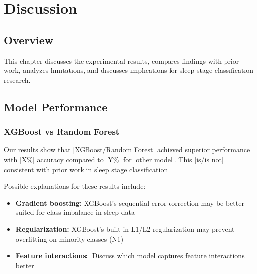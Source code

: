 \chapter{Discussion}
\label{ch:discussion}


\section{Overview}
\label{sec:discussion_overview}

This chapter discusses the experimental results, compares findings with prior work, analyzes limitations, and discusses implications for sleep stage classification research.

\section{Model Performance}
\label{sec:performance_discussion}

\subsection{XGBoost vs Random Forest}
\label{subsec:xgb_vs_rf}


Our results show that [XGBoost/Random Forest] achieved superior performance with [X\%] accuracy compared to [Y\%] for [other model]. This [is/is not] consistent with prior work in sleep stage classification \cite{TODO_ADD_REF}.

Possible explanations for these results include:

\begin{itemize}
    \item \textbf{Gradient boosting:} XGBoost's sequential error correction may be better suited for class imbalance in sleep data
    \item \textbf{Regularization:} XGBoost's built-in L1/L2 regularization may prevent overfitting on minority classes (N1)
    \item \textbf{Feature interactions:} [Discuss which model captures feature interactions better]
\end{itemize}

